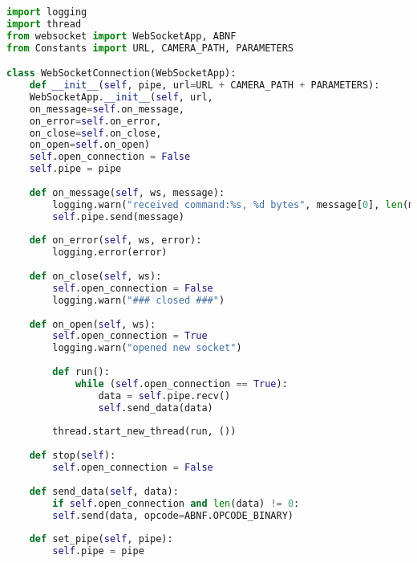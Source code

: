 \documentclass[hidelinks,11pt,a4paper,oneside,article]{memoir}
\begin{document}
\begin{lstlisting}[label={listing:rpi-ws},caption={Websocket Class},language=Python, style=styleprogramming]
import logging
import thread
from websocket import WebSocketApp, ABNF
from Constants import URL, CAMERA_PATH, PARAMETERS

class WebSocketConnection(WebSocketApp):
    def __init__(self, pipe, url=URL + CAMERA_PATH + PARAMETERS):
    WebSocketApp.__init__(self, url,
    on_message=self.on_message,
    on_error=self.on_error,
    on_close=self.on_close,
    on_open=self.on_open)
    self.open_connection = False
    self.pipe = pipe
    
    def on_message(self, ws, message):
        logging.warn("received command:%s, %d bytes", message[0], len(message))
        self.pipe.send(message)
    
    def on_error(self, ws, error):
        logging.error(error)
    
    def on_close(self, ws):
        self.open_connection = False
        logging.warn("### closed ###")
    
    def on_open(self, ws):
        self.open_connection = True
        logging.warn("opened new socket")
    
        def run():
            while (self.open_connection == True):
                data = self.pipe.recv()
                self.send_data(data)
        
        thread.start_new_thread(run, ())
    
    def stop(self):
        self.open_connection = False
    
    def send_data(self, data):
        if self.open_connection and len(data) != 0:
        self.send(data, opcode=ABNF.OPCODE_BINARY)
        
    def set_pipe(self, pipe):
        self.pipe = pipe
\end{lstlisting}\vspace{14pt}
\end{document}
